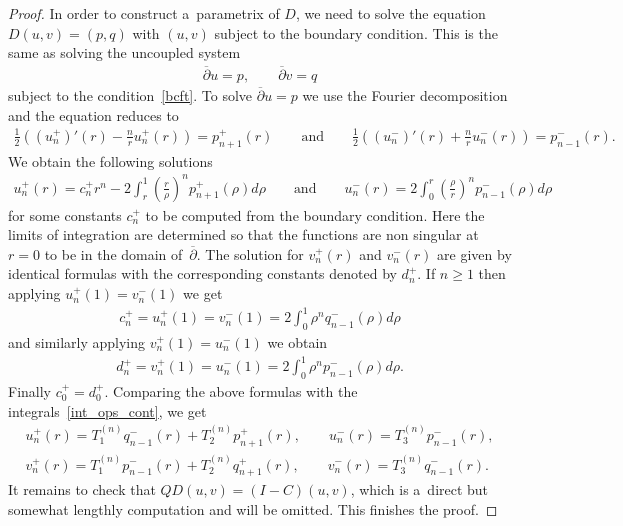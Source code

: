 \begin{proof}
In order to construct a~parametrix of $D$, we need to solve the equation $D(u,v) = (p,q)$ with $(u,v)$ subject to the
boundary condition.
This is the same as solving the uncoupled system
\begin{gather*}
\overline{\partial}u = p,
\qquad
\overline{\partial}v = q
\end{gather*}
subject to the condition~\eqref{bcft}.
To solve $\overline{\partial}u=p$ we use the Fourier decomposition and the equation reduces to
\begin{gather*}
\frac{1}{2}\left((u_n^+)'(r) - \frac{n}{r}u_n^+(r)\right) = p_{n+1}^+(r)
\qquad
\textrm{and}
\qquad
\frac{1}{2}\left((u_n^-)'(r) + \frac{n}{r}u_n^-(r)\right) = p_{n-1}^-(r).
\end{gather*}
We obtain the following solutions
\begin{gather*}
u_n^+(r) = c_n^+ r^n - 2\int_{r}^{1} \left(\frac{r}{\rho}\right)^n p_{n+1}^+(\rho)d \rho
\qquad
\textrm{and}
\qquad
u_n^-(r) = 2\int_{0}^{r} \left(\frac{\rho}{r}\right)^n p_{n-1}^-(\rho)d \rho
\end{gather*}
for some constants $c_n^+$ to be computed from the boundary condition.
Here the limits of integration are determined so that the functions are non singular at $r=0$ to be in the domain of~$\overline{\partial}$.
The solution for $v_n^+(r)$ and $v_n^-(r)$ are given by identical formulas with the corresponding constants denoted by
$d_n^+$.
If $n\ge1$ then applying $u_n^+(1) = v_n^-(1)$ we get
\begin{gather*}
c_n^+ = u_n^+(1) = v_n^-(1) = 2\int_0^1 \rho^n q_{n-1}^-(\rho)d\rho
\end{gather*}
and similarly applying $v_n^+(1) = u_n^-(1)$ we obtain
\begin{gather*}
d_n^+ = v_n^+(1) = u_n^-(1) = 2\int_0^1 \rho^n p_{n-1}^-(\rho)d\rho.
\end{gather*}
Finally $c_0^+=d_0^+$.
Comparing the above formulas with the integrals~\eqref{int_ops_cont}, we get
\begin{gather*}
u_n^+(r) = T_1^{(n)}q_{n-1}^-(r) + T_2^{(n)}p_{n+1}^+(r),
\qquad
u_n^-(r) = T_3^{(n)}p_{n-1}^-(r),
\\
v_n^+(r) = T_1^{(n)}p_{n-1}^-(r) + T_2^{(n)}q_{n+1}^+(r),
\qquad
v_n^-(r) = T_3^{(n)}q_{n-1}^-(r).
\end{gather*}
It remains to check that $QD(u,v) = (I-C)(u,v)$, which is a~direct but somewhat lengthly computation and will be
omitted.
This f\/inishes the proof.
\end{proof}

